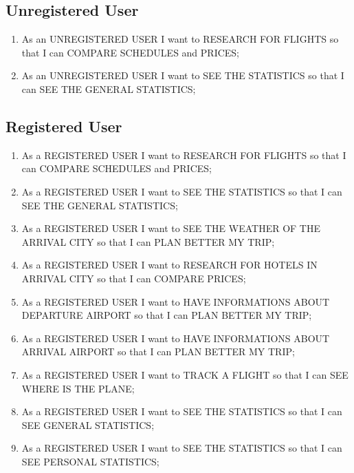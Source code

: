 \documentclass[11pt]{article}
\begin{document}
\subsection{Unregistered User}
\begin{enumerate}
	\item As an UNREGISTERED USER I want to RESEARCH FOR FLIGHTS so that I can COMPARE SCHEDULES and PRICES;
	\item As an UNREGISTERED USER I want to SEE THE STATISTICS so that I can SEE THE GENERAL STATISTICS;
\end{enumerate}

\subsection{Registered User}
\begin{enumerate}
	\item As a REGISTERED USER I want to RESEARCH FOR FLIGHTS so that I can COMPARE SCHEDULES and PRICES;
	\item As a REGISTERED USER I want to SEE THE STATISTICS so that I can SEE THE GENERAL STATISTICS;
	\item As a REGISTERED USER I want to SEE THE WEATHER OF THE ARRIVAL CITY so that I can PLAN BETTER MY TRIP;
	\item As a REGISTERED USER I want to RESEARCH FOR HOTELS IN ARRIVAL CITY so that I can COMPARE PRICES;
	\item As a REGISTERED USER I want to HAVE INFORMATIONS ABOUT DEPARTURE AIRPORT so that I can PLAN BETTER MY TRIP;
	\item As a REGISTERED USER I want to HAVE INFORMATIONS ABOUT ARRIVAL AIRPORT so that I can PLAN BETTER MY TRIP;
	\item As a REGISTERED USER I want to TRACK A FLIGHT so that I can SEE WHERE IS THE PLANE;
	\item As a REGISTERED USER I want to SEE THE STATISTICS so that I can SEE GENERAL STATISTICS;
	\item As a REGISTERED USER I want to SEE THE STATISTICS so that I can SEE PERSONAL STATISTICS;
\end{enumerate}
\end{document}

